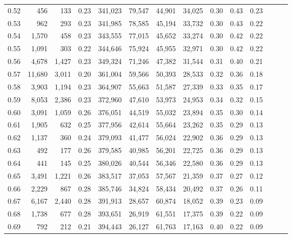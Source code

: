 \begin{tabular}{rrrrrrrrrrrrrr}
0.52 &     456 &    133 &  0.23 &  341,023 &   79,547 &  44,901 &  34,025 &  0.30 &  0.43 &      0.23 \\
0.53 &     962 &    293 &  0.23 &  341,985 &   78,585 &  45,194 &  33,732 &  0.30 &  0.43 &      0.22 \\
0.54 &   1,570 &    458 &  0.23 &  343,555 &   77,015 &  45,652 &  33,274 &  0.30 &  0.42 &      0.22 \\
0.55 &   1,091 &    303 &  0.22 &  344,646 &   75,924 &  45,955 &  32,971 &  0.30 &  0.42 &      0.22 \\
0.56 &   4,678 &  1,427 &  0.23 &  349,324 &   71,246 &  47,382 &  31,544 &  0.31 &  0.40 &      0.21 \\
0.57 &  11,680 &  3,011 &  0.20 &  361,004 &   59,566 &  50,393 &  28,533 &  0.32 &  0.36 &      0.18 \\
0.58 &   3,903 &  1,194 &  0.23 &  364,907 &   55,663 &  51,587 &  27,339 &  0.33 &  0.35 &      0.17 \\
0.59 &   8,053 &  2,386 &  0.23 &  372,960 &   47,610 &  53,973 &  24,953 &  0.34 &  0.32 &      0.15 \\
0.60 &   3,091 &  1,059 &  0.26 &  376,051 &   44,519 &  55,032 &  23,894 &  0.35 &  0.30 &      0.14 \\
0.61 &   1,905 &    632 &  0.25 &  377,956 &   42,614 &  55,664 &  23,262 &  0.35 &  0.29 &      0.13 \\
0.62 &   1,137 &    360 &  0.24 &  379,093 &   41,477 &  56,024 &  22,902 &  0.36 &  0.29 &      0.13 \\
0.63 &     492 &    177 &  0.26 &  379,585 &   40,985 &  56,201 &  22,725 &  0.36 &  0.29 &      0.13 \\
0.64 &     441 &    145 &  0.25 &  380,026 &   40,544 &  56,346 &  22,580 &  0.36 &  0.29 &      0.13 \\
0.65 &   3,491 &  1,221 &  0.26 &  383,517 &   37,053 &  57,567 &  21,359 &  0.37 &  0.27 &      0.12 \\
0.66 &   2,229 &    867 &  0.28 &  385,746 &   34,824 &  58,434 &  20,492 &  0.37 &  0.26 &      0.11 \\
0.67 &   6,167 &  2,440 &  0.28 &  391,913 &   28,657 &  60,874 &  18,052 &  0.39 &  0.23 &      0.09 \\
0.68 &   1,738 &    677 &  0.28 &  393,651 &   26,919 &  61,551 &  17,375 &  0.39 &  0.22 &      0.09 \\
0.69 &     792 &    212 &  0.21 &  394,443 &   26,127 &  61,763 &  17,163 &  0.40 &  0.22 &      0.09 \\

\end{tabular}
